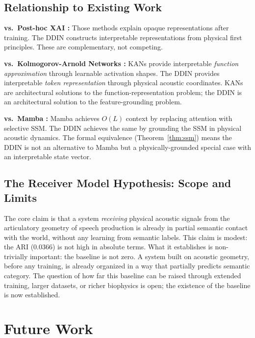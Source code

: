 \documentclass{article}
\begin{document}
\subsection{Relationship to Existing Work}

\textbf{vs.~Post-hoc XAI \cite{ribeiro2016, lundberg2017}:} Those methods explain opaque representations after training. The DDIN constructs interpretable representations from physical first principles. These are complementary, not competing.

\textbf{vs.~Kolmogorov-Arnold Networks \cite{liu2024kan}:} KANs provide interpretable \textit{function approximation} through learnable activation shapes. The DDIN provides interpretable \textit{token representation} through physical acoustic coordinates. KANs are architectural solutions to the function-representation problem; the DDIN is an architectural solution to the feature-grounding problem.

\textbf{vs.~Mamba \cite{gu2022mamba}:} Mamba achieves $O(L)$ context by replacing attention with selective SSM. The DDIN achieves the same by grounding the SSM in physical acoustic dynamics. The formal equivalence (Theorem~\ref{thm:ssm}) means the DDIN is not an alternative to Mamba but a physically-grounded special case with an interpretable state vector.

\subsection{The Receiver Model Hypothesis: Scope and Limits}

The core claim is that a system \textit{receiving} physical acoustic signals from the articulatory geometry of speech production is already in partial semantic contact with the world, without any learning from semantic labels. This claim is modest: the ARI ($0.0366$) is not high in absolute terms. What it establishes is non-trivially important: the baseline is not zero. A system built on acoustic geometry, before any training, is already organized in a way that partially predicts semantic category. The question of how far this baseline can be raised through extended training, larger datasets, or richer biophysics is open; the existence of the baseline is now established.

\section{Future Work}
\end{document}

